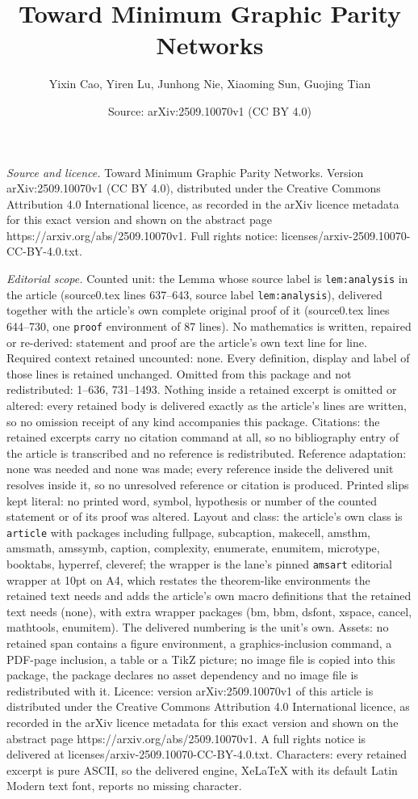 \documentclass[10pt,a4paper]{amsart}
\title[Toward Minimum Graphic Parity Networks]{Toward Minimum Graphic Parity Networks}
\author{Yixin Cao, Yiren Lu, Junhong Nie, Xiaoming Sun, Guojing Tian}
\date{Source: arXiv:2509.10070v1 (CC BY 4.0)}
\begin{document}
\maketitle

\noindent\emph{Source and licence.} Toward Minimum Graphic Parity Networks. Version arXiv:2509.10070v1 (CC BY 4.0), distributed under the Creative Commons Attribution 4.0 International licence, as recorded in the arXiv licence metadata for this exact version and shown on the abstract page https://arxiv.org/abs/2509.10070v1. Full rights notice: licenses/arxiv-2509.10070-CC-BY-4.0.txt.\par\smallskip

\noindent\textit{Editorial scope.} Counted unit: the Lemma whose source label is \texttt{lem:analysis} in the article (source0.tex lines 637--643, source label \texttt{lem:analysis}), delivered together with the article's own complete original proof of it (source0.tex lines 644--730, one \texttt{proof} environment of 87 lines). No mathematics is written, repaired or re-derived: statement and proof are the article's own text line for line. Required context retained uncounted: none. Every definition, display and label of those lines is retained unchanged. Omitted from this package and not redistributed: 1--636, 731--1493. Nothing inside a retained excerpt is omitted or altered: every retained body is delivered exactly as the article's lines are written, so no omission receipt of any kind accompanies this package. Citations: the retained excerpts carry no citation command at all, so no bibliography entry of the article is transcribed and no reference is redistributed. Reference adaptation: none was needed and none was made; every reference inside the delivered unit resolves inside it, so no unresolved reference or citation is produced. Printed slips kept literal: no printed word, symbol, hypothesis or number of the counted statement or of its proof was altered. Layout and class: the article's own class is \texttt{article} with packages including fullpage, subcaption, makecell, amsthm, amsmath, amssymb, caption, complexity, enumerate, enumitem, microtype, booktabs, hyperref, cleveref; the wrapper is the lane's pinned \texttt{amsart} editorial wrapper at 10pt on A4, which restates the theorem-like environments the retained text needs and adds the article's own macro definitions that the retained text needs (none), with extra wrapper packages (bm, bbm, dsfont, xspace, cancel, mathtools, enumitem). The delivered numbering is the unit's own. Assets: no retained span contains a figure environment, a graphics-inclusion command, a PDF-page inclusion, a table or a TikZ picture; no image file is copied into this package, the package declares no asset dependency and no image file is redistributed with it. Licence: version arXiv:2509.10070v1 of this article is distributed under the Creative Commons Attribution 4.0 International licence, as recorded in the arXiv licence metadata for this exact version and shown on the abstract page https://arxiv.org/abs/2509.10070v1. A full rights notice is delivered at licenses/arxiv-2509.10070-CC-BY-4.0.txt. Characters: every retained excerpt is pure ASCII, so the delivered engine, XeLaTeX with its default Latin Modern text font, reports no missing character.
\end{document}
